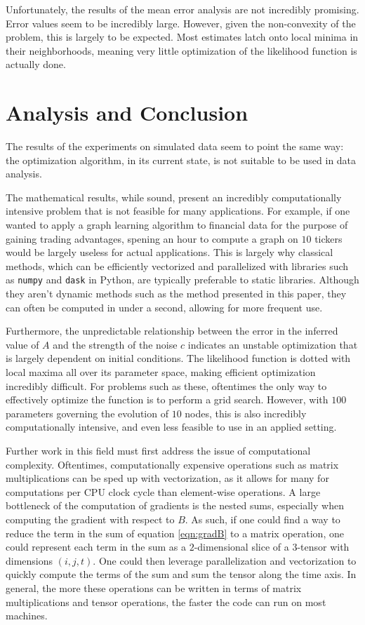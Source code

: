 \documentclass[12pt]{article}
\theoremstyle{definition}
\begin{document}
Unfortunately, the results of the mean error analysis are not incredibly promising. Error values seem to be incredibly large. However, given the non-convexity of the problem, this is largely to be expected. Most estimates latch onto local minima in their neighborhoods, meaning very little optimization of the likelihood function is actually done. 

\section{Analysis and Conclusion}

The results of the experiments on simulated data seem to point the same way: the optimization algorithm, in its current state, is not suitable to be used in data analysis. 

The mathematical results, while sound, present an incredibly computationally intensive problem that is not feasible for many applications. For example, if one wanted to apply a graph learning algorithm to financial data for the purpose of gaining trading advantages, spening an hour to compute a graph on $10$ tickers would be largely useless for actual applications. This is largely why classical methods, which can be efficiently vectorized and parallelized with libraries such as \texttt{numpy} and \texttt{dask} in Python, are typically preferable to static libraries. Although they aren't dynamic methods such as the method presented in this paper, they can often be computed in under a second, allowing for more frequent use.

Furthermore, the unpredictable relationship between the error in the inferred value of $A$ and the strength of the noise $c$ indicates an unstable optimization that is largely dependent on initial conditions. The likelihood function is dotted with local maxima all over its parameter space, making efficient optimization incredibly difficult. For problems such as these, oftentimes the only way to effectively optimize the function is to perform a grid search. However, with $100$ parameters governing the evolution of $10$ nodes, this is also incredibly computationally intensive, and even less feasible to use in an applied setting.

Further work in this field must first address the issue of computational complexity. Oftentimes, computationally expensive operations such as matrix multiplications can be sped up with vectorization, as it allows for many for computations per CPU clock cycle than element-wise operations. A large bottleneck of the computation of gradients is the nested sums, especially when computing the gradient with respect to $B$. As such, if one could find a way to reduce the term in the sum of equation \ref{eqn:gradB} to a matrix operation, one could represent each term in the sum as a $2$-dimensional slice of a $3$-tensor with dimensions $(i, j, t)$. One could then leverage parallelization and vectorization to quickly compute the terms of the sum and sum the tensor along the time axis. In general, the more these operations can be written in terms of matrix multiplications and tensor operations, the faster the code can run on most machines.
\end{document}
